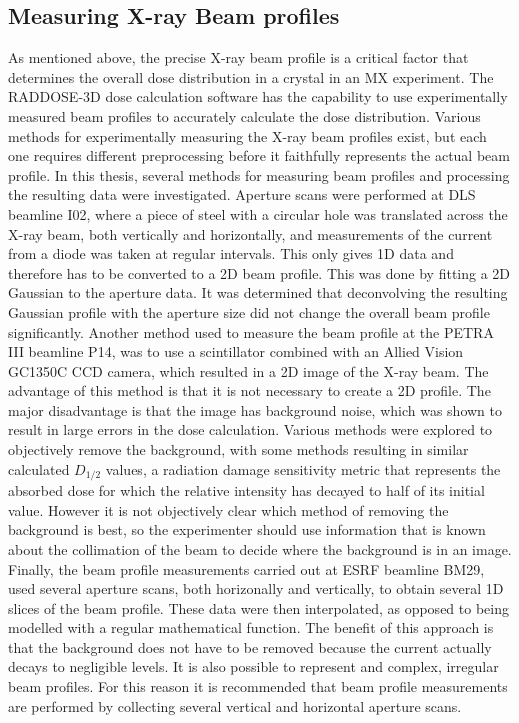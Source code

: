 \subsection{Measuring X-ray Beam profiles}
\label{sub:Measuring X-ray Beam profiles}
As mentioned above, the precise X-ray beam profile is a critical factor that determines the overall dose distribution in a crystal in an MX experiment.
The RADDOSE-3D dose calculation software has the capability to use experimentally measured beam profiles to accurately calculate the dose distribution.
Various methods for experimentally measuring the X-ray beam profiles exist, but each one requires different preprocessing before it faithfully represents the actual beam profile.
In this thesis, several methods for measuring beam profiles and processing the resulting data were investigated.
Aperture scans were performed at DLS beamline I02, where a piece of steel with a circular hole was translated across the X-ray beam, both vertically and horizontally, and measurements of the current from a diode was taken at regular intervals.
This only gives 1D data and therefore has to be converted to a 2D beam profile.
This was done by fitting a 2D Gaussian to the aperture data.
It was determined that deconvolving the resulting Gaussian profile with the aperture size did not change the overall beam profile significantly.
Another method used to measure the beam profile at the PETRA III beamline P14, was to use a scintillator combined with an Allied Vision GC1350C CCD camera, which resulted in a 2D image of the X-ray beam.
The advantage of this method is that it is not necessary to create a 2D profile.
The major disadvantage is that the image has background noise, which was shown to result in large errors in the dose calculation.
Various methods were explored to objectively remove the background, with some methods resulting in similar calculated $D_{1/2}$ values, a radiation damage sensitivity metric that represents the absorbed dose for which the relative intensity has decayed to half of its initial value.
However it is not objectively clear which method of removing the background is best, so the experimenter should use information that is known about the collimation of the beam to decide where the background is in an image.
Finally, the beam profile measurements carried out at ESRF beamline BM29, used several aperture scans, both horizonally and vertically, to obtain several 1D slices of the beam profile.
These data were then interpolated, as opposed to being modelled with a regular mathematical function.
The benefit of this approach is that the background does not have to be removed because the current actually decays to negligible levels.
It is also possible to represent and complex, irregular beam profiles.
For this reason it is recommended that beam profile measurements are performed by collecting several vertical and horizontal aperture scans.

